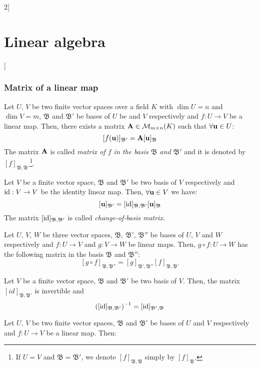 \documentclass[../../../main.tex]{subfiles}
\begin{document}
\begin{multicols}{2}[\section{Linear algebra}]
    \subsubsection*{Matrix of a linear map}
    \begin{prop}
        Let $U$, $V$ be two finite vector spaces over a field $K$ with $\dim U=n$ and $\dim V=m$, $\mathfrak{B}$ and $\mathfrak{B}'$ be bases of $U$ be and $V$ respectively and $f:U\rightarrow V$ be a linear map. Then, there exists a matrix $\boldsymbol{\mathrm{A}}\in\mathcal{M}_{m\times n}(K)$ such that $\forall\boldsymbol{\mathrm{u}}\in U$: $$[f(\boldsymbol{\mathrm{u}})]_{\mathfrak{B}'}=\boldsymbol{\mathrm{A}}[\boldsymbol{\mathrm{u}}]_\mathfrak{B}$$
        The matrix $\boldsymbol{\mathrm{A}}$ is called \textit{matrix of $f$ in the basis $\mathfrak{B}$ and $\mathfrak{B}'$} and it is denoted by $[f]_{\mathfrak{B},\mathfrak{B}'}$\footnote{If $U=V$ and $\mathfrak{B}=\mathfrak{B}'$, we denote $[f]_{\mathfrak{B},\mathfrak{B}}$ simply by $[f]_{\mathfrak{B}}$.}.
    \end{prop}
    \begin{corollary}
        Let $V$ be a finite vector space, $\mathfrak{B}$ and $\mathfrak{B}'$ be two basis of $V$ respectively and $\mathrm{id}:V\rightarrow V$ be the identity linear map. Then, $\forall\boldsymbol{\mathrm{u}}\in V$ we have: $$[\boldsymbol{\mathrm{u}}]_{\mathfrak{B}'}=[\mathrm{id}]_{\mathfrak{B},\mathfrak{B}'}[\boldsymbol{\mathrm{u}}]_\mathfrak{B}$$ The matrix $[\mathrm{id}]_{\mathfrak{B},\mathfrak{B}'}$ is called \textit{change-of-basis matrix}.
    \end{corollary}
    \begin{prop}
        Let $U$, $V$, $W$ be three vector spaces, $\mathfrak{B}$, $\mathfrak{B}'$, $\mathfrak{B}''$ be bases of $U$, $V$ and $W$ respectively and $f:U\rightarrow V$ and $g:V\rightarrow W$ be linear maps. Then, $g\circ f:U\rightarrow W$ has the following matrix in the basis $\mathfrak{B}$ and $\mathfrak{B}''$: $$[g\circ f]_{\mathfrak{B},\mathfrak{B}''}=[g]_{\mathfrak{B}',\mathfrak{B}''}[f]_{\mathfrak{B},\mathfrak{B}'}$$
    \end{prop}
    \begin{corollary}
        Let $V$ be a finite vector space, $\mathfrak{B}$ and $\mathfrak{B}'$ be two basis of $V$. Then, the matrix $[id]_{\mathfrak{B},\mathfrak{B}'}$ is invertible and $${\left([\mathrm{id}]_{\mathfrak{B},\mathfrak{B}'}\right)}^{-1}=[\mathrm{id}]_{\mathfrak{B}',\mathfrak{B}}$$
    \end{corollary}
    \begin{corollary}
        Let $U$, $V$ be two finite vector spaces, $\mathfrak{B}$ and $\mathfrak{B}'$ be bases of $U$ and $V$ respectively and $f:U\rightarrow V$ be a linear map. Then:

\end{corollary}
\end{multicols}
\end{document}
